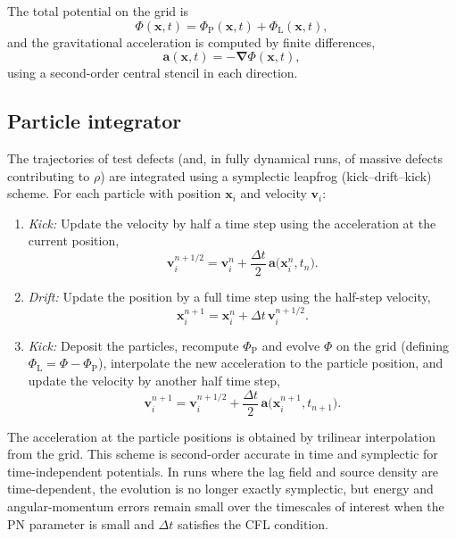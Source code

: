 \documentclass[11pt]{article}
\newcommand{\PhiP}{\Phi_{\mathrm{P}}}
\newcommand{\PhiL}{\Phi_{\mathrm{L}}}
\begin{document}
The total potential on the grid is
\begin{equation}
  \Phi(\mathbf{x},t)
  = \PhiP(\mathbf{x},t) + \PhiL(\mathbf{x},t),
\end{equation}
and the gravitational acceleration is computed by finite differences,
\begin{equation}
  \mathbf{a}(\mathbf{x},t)
  = -\bm{\nabla}\Phi(\mathbf{x},t),
\end{equation}
using a second-order central stencil in each direction.

\subsection{Particle integrator}
\label{app:numerics_particles}

The trajectories of test defects (and, in fully dynamical runs, of massive defects contributing to $\rho$) are integrated using a symplectic leapfrog (kick–drift–kick) scheme. For each particle with position $\mathbf{x}_i$ and velocity $\mathbf{v}_i$:

\begin{enumerate}
  \item \emph{Kick:} Update the velocity by half a time step using the acceleration at the current position,
  \begin{equation}
    \mathbf{v}_i^{n+1/2}
    = \mathbf{v}_i^n + \frac{\Delta t}{2}\,\mathbf{a}\bigl(\mathbf{x}_i^n,t_n\bigr).
  \end{equation}
  \item \emph{Drift:} Update the position by a full time step using the half-step velocity,
  \begin{equation}
    \mathbf{x}_i^{n+1}
    = \mathbf{x}_i^n + \Delta t\,\mathbf{v}_i^{n+1/2}.
  \end{equation}
  \item \emph{Kick:} Deposit the particles, recompute $\PhiP$ and evolve $\Phi$ on the grid (defining $\PhiL = \Phi - \PhiP$), interpolate the new acceleration to the particle position, and update the velocity by another half time step,
  \begin{equation}
    \mathbf{v}_i^{n+1}
    = \mathbf{v}_i^{n+1/2}
      + \frac{\Delta t}{2}\,\mathbf{a}\bigl(\mathbf{x}_i^{n+1},t_{n+1}\bigr).
  \end{equation}
\end{enumerate}

The acceleration at the particle positions is obtained by trilinear interpolation from the grid. This scheme is second-order accurate in time and symplectic for time-independent potentials. In runs where the lag field and source density are time-dependent, the evolution is no longer exactly symplectic, but energy and angular-momentum errors remain small over the timescales of interest when the PN parameter is small and $\Delta t$ satisfies the CFL condition.
\end{document}
